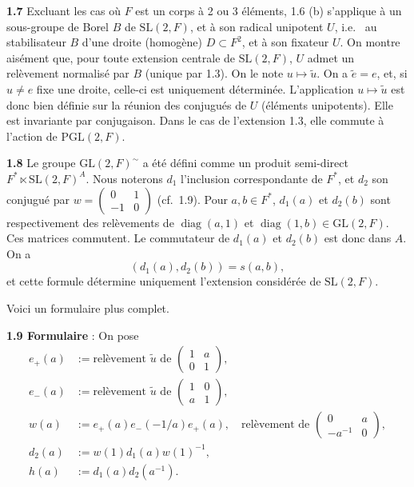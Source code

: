 \documentclass[12pt,a4paper]{article}
\theoremstyle{plain}
\theoremstyle{definition}
\theoremstyle{remark}
\DeclareMathOperator{\diag}{diag}
\newcommand{\wt}{\widetilde}
\begin{document}
\textbf{1.7} Excluant les cas où $F$ est un corps à 2 ou 3 éléments, 1.6 (b) s'applique à un sous-groupe de Borel $B$ de $\mathrm{SL}(2, F)$, et à son radical unipotent $U$, i.e.
\ au stabilisateur $B$ d'une droite (homogène) $D \subset F^2$, et à son fixateur $U$. On montre aisément que, pour toute extension centrale de $\mathrm{SL}(2, F)$, $U$ admet un relèvement normalisé par $B$ (unique par 1.3). On le note $u \mapsto \wt{u}$. On a $\wt{e} = e$, et, si $u \neq e$ fixe une droite, celle-ci est uniquement déterminée. L'application $u \mapsto \wt{u}$ est donc bien définie sur la réunion des conjugués de $U$ (éléments unipotents). Elle est invariante par conjugaison. Dans le cas de l'extension 1.3, elle commute à l'action de $\mathrm{PGL}(2, F)$.

\textbf{1.8} Le groupe $\mathrm{GL}(2, F)^\sim$ a été défini comme un produit semi-direct $F^* \ltimes \mathrm{SL}(2, F)^A$. Nous noterons $d_1$ l'inclusion correspondante de $F^*$, et $d_2$ son conjugué par $w = \begin{pmatrix} 0 & 1 \\ -1 & 0 \end{pmatrix}$ (cf.\ 1.9). Pour $a, b \in F^*$, $d_1(a)$ et $d_2(b)$ sont respectivement des relèvements de $\diag(a, 1)$ et $\diag(1, b) \in \mathrm{GL}(2, F)$. Ces matrices commutent. Le commutateur de $d_1(a)$ et $d_2(b)$ est donc dans $A$. On a
\[
(d_1(a), d_2(b)) = s(a, b),
\]
et cette formule détermine uniquement l'extension considérée de $\mathrm{SL}(2, F)$.

Voici un formulaire plus complet.

\textbf{1.9 Formulaire} : On pose
\begin{align*}
e_+(a) &:= \text{relèvement } \wt{u} \text{ de } \begin{pmatrix} 1 & a \\ 0 & 1 \end{pmatrix},\\
e_-(a) &:= \text{relèvement } \wt{u} \text{ de } \begin{pmatrix} 1 & 0 \\ a & 1 \end{pmatrix},\\
w(a) &:= e_+(a) e_-(-1/a) e_+(a), \quad \text{relèvement de } \begin{pmatrix} 0 & a \\ -a^{-1} & 0 \end{pmatrix},\\
d_2(a) &:= w(1) d_1(a) w(1)^{-1},\\
h(a) &:= d_1(a) d_2(a^{-1}).
\end{align*}
\end{document}

